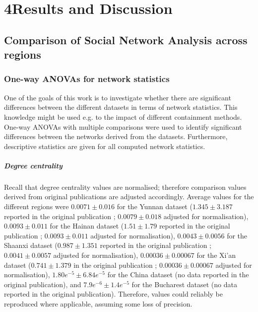 \chapter{4\quad Results and Discussion}
\label{ch:results_discussion}

\section{Comparison of Social Network Analysis across regions}
\label{sec:res_sna}

\subsection{One-way ANOVAs for network statistics}
\label{sec:sna_anovas}

One of the goals of this work is to investigate whether there are significant differences between the different datasets in terms of network statistics. This knowledge might be used e.g. to the impact of different containment methods. One-way ANOVAs with multiple comparisons were used to identify significant differences between the networks derived from the datasets. Furthermore, descriptive statistics are given for all computed network statistics.

\paragraph{Degree centrality} Recall that degree centrality values are normalised; therefore comparison values derived from original publications are adjusted accordingly. Average values for the different regions were $0.0071\pm0.016$ for the Yunnan dataset ($1.345\pm3.187$ reported in the original publication \cite{hainan_publication}; $0.0079\pm0.018$ adjusted for normalisation), $0.0093\pm0.011$ for the Hainan dataset ($1.51\pm1.79$ reported in the original publication \cite{hainan_publication}; $0.0093\pm0.011$ adjusted for normalisation), $0.0043\pm0.0056$ for the Shaanxi dataset ($0.987\pm1.351$ reported in the original publication \cite{shaanxi_publication}; $0.0041\pm0.0057$ adjusted for normalisation), $0.00036\pm0.00067$ for the Xi'an dataset ($0.741\pm1.379$ in the original publication \cite{xian_publication}; $0.00036\pm0.00067$ adjusted for normalisation), $1.80e^{-5}\pm6.84e^{-5}$ for the China dataset (no data reported in the original publication), and $7.9e^{-6}\pm1.4e^{-5}$ for the Bucharest dataset (no data reported in the original publication). Therefore, values could reliably be reproduced where applicable, assuming some loss of precision.

